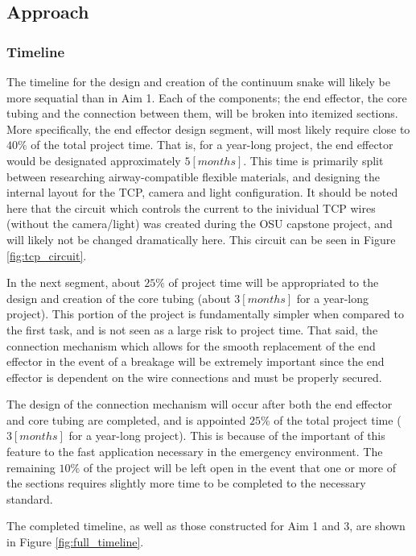 \subsection{Approach}

	\subsubsection{Timeline}
	
		The timeline for the design and creation of the continuum snake will likely be more sequatial than in Aim 1. Each of the components; the end effector, the core tubing and the connection between them, will be broken into itemized sections. More specifically, the end effector design segment, will most likely require close to $40\%$ of the total project time. That is, for a year-long project, the end effector would be designated approximately $5[months]$. This time is primarily split between researching airway-compatible flexible materials, and designing the internal layout for the TCP, camera and light configuration. It should be noted here that the circuit which controls the current to the inividual TCP wires (without the camera/light) was created during the OSU capstone project, and will likely not be changed dramatically here. This circuit can be seen in Figure \ref{fig:tcp_circuit}.
		
		In the next segment, about $25\%$ of project time will be appropriated to the design and creation of the core tubing (about $3[months]$ for a year-long project). This portion of the project is fundamentally simpler when compared to the first task, and is not seen as a large risk to project time. That said, the connection mechanism which allows for the smooth replacement of the end effector in the event of a breakage will be extremely important since the end effector is dependent on the wire connections and must be properly secured.
		
		The design of the connection mechanism will occur after both the end effector and core tubing are completed, and is appointed $25\%$ of the total project time ($3[months]$ for a year-long project). This is because of the important of this feature to the fast application necessary in the emergency environment. The remaining $10\%$ of the project will be left open in the event that one or more of the sections requires slightly more time to be completed to the necessary standard.
		
		The completed timeline, as well as those constructed for Aim 1 and 3, are shown in Figure \ref{fig:full_timeline}.
	
